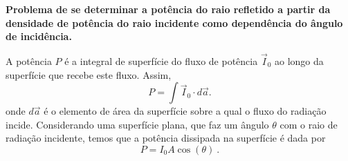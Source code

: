 \documentclass[12pt,a4paper]{article}
\begin{document}
	
	{\bf Problema de se determinar a potência do raio refletido a partir da
	densidade de potência do raio incidente como dependência do ângulo de
	incidência.}

	\bigskip

	A potência $P$ é a integral de superfície do fluxo de potência $\vec I_0$
	ao longo da superfície que recebe este fluxo. Assim,
	\begin{equation}
		P = \int \vec I_0 \cdot d\vec a .
	\end{equation}
	onde $ d\vec a$ é o elemento de área da superfície sobre a qual o fluxo do
	radiação incide. Considerando uma superfície plana, que faz um ângulo $\theta$ 
	com o raio de radiação incidente, temos que a potência dissipada na superfície é dada por
	\begin{equation}
		P = I_{0}A\cos(\theta)\ . 
	\end{equation}
\end{document}
